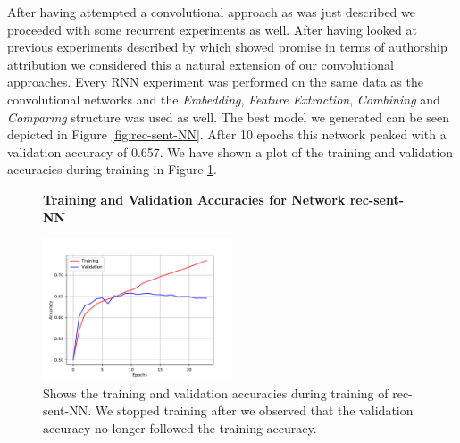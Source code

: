 After having attempted a convolutional approach as was just described we
proceeded with some recurrent experiments as well. After having looked at
previous experiments described by \cite{qian:2018} which showed promise in
terms of authorship attribution we considered this a natural extension of
our convolutional approaches. Every \gls{RNN} experiment was performed on
the same data as the convolutional networks and the \textit{Embedding},
\textit{Feature Extraction}, \textit{Combining} and \textit{Comparing} structure
was used as well. The best model we generated can be seen depicted in Figure
\ref{fig:rec-sent-NN}. After 10 epochs this network peaked with a validation
accuracy of 0.657. We have shown a plot of the training and validation
accuracies during training in Figure \ref{fig:rec-sent-NN-training}.

\begin{figure}
    \centering
    \textbf{Training and Validation Accuracies for Network \gls{rec-sent-NN}}\par\medskip
    \includegraphics[width=0.5\textwidth]{./pictures/experiments/rec_sent_nn/training}
    \caption{Shows the training and validation accuracies during training of
        \gls{rec-sent-NN}. We stopped training after we observed that the
        validation accuracy no longer followed the training accuracy.}
    \label{fig:rec-sent-NN-training}
\end{figure}

